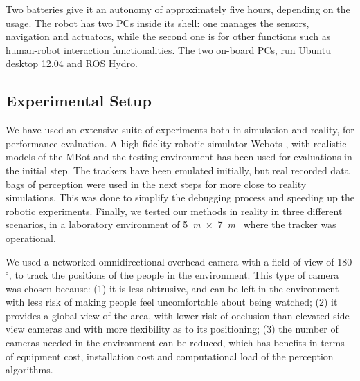 Two batteries give it an autonomy of approximately five hours, depending on the usage.
The robot has two PCs inside its shell: one manages the sensors, navigation and actuators, while the second one is for other functions such as human-robot interaction functionalities.%
 The two on-board PCs, run Ubuntu desktop 12.04 and ROS Hydro. 


\subsection{Experimental Setup}
\label{sec:Experimental_setup}

We have used an extensive suite of experiments both in simulation and reality, for performance evaluation. A high fidelity robotic simulator Webots \cite{michel1998webots}, with realistic models of the MBot and the testing environment has been used for evaluations in the initial step. The trackers have been emulated initially, but real recorded data bags of perception were used in the next steps for more close to reality simulations. This was done to simplify the debugging process and speeding up the robotic experiments. %
Finally, we tested our methods in reality in three different scenarios, in a laboratory environment of 5~\textit{m}~$\times$~7~\textit{m}%
~where the tracker was operational.
 

We used a networked omnidirectional overhead camera with a field of view of 180$^{\circ}$, to track the positions of the people in the environment. This type of camera was chosen because: (1) it is less obtrusive, and can be left in the environment with less risk of making people feel uncomfortable about being watched; 
(2) it provides a global view of the area, with lower risk of occlusion than elevated side-view cameras and with more flexibility as to its positioning; (3) the number of cameras needed in the environment can be reduced, which has benefits in terms of equipment cost, installation cost and computational load of the perception algorithms. 


